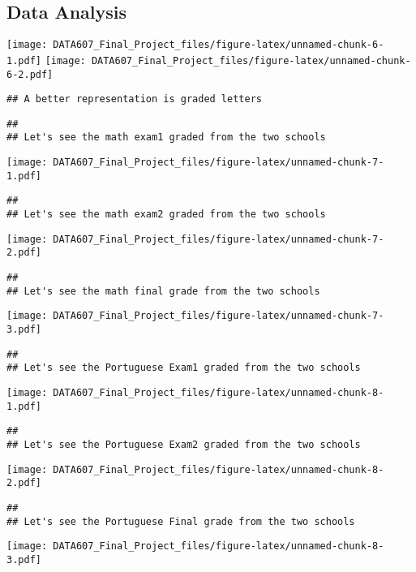 \documentclass[
]{article}
\begin{document}
\hypertarget{data-analysis}{%
\subsection{Data Analysis}\label{data-analysis}}

\texttt{[image: DATA607\_Final\_Project\_files/figure-latex/unnamed-chunk-6-1.pdf]}
\texttt{[image: DATA607\_Final\_Project\_files/figure-latex/unnamed-chunk-6-2.pdf]}

\begin{verbatim}
## A better representation is graded letters
\end{verbatim}

\begin{verbatim}
## 
## Let's see the math exam1 graded from the two schools
\end{verbatim}

\texttt{[image: DATA607\_Final\_Project\_files/figure-latex/unnamed-chunk-7-1.pdf]}

\begin{verbatim}
## 
## Let's see the math exam2 graded from the two schools
\end{verbatim}

\texttt{[image: DATA607\_Final\_Project\_files/figure-latex/unnamed-chunk-7-2.pdf]}

\begin{verbatim}
## 
## Let's see the math final grade from the two schools
\end{verbatim}

\texttt{[image: DATA607\_Final\_Project\_files/figure-latex/unnamed-chunk-7-3.pdf]}

\begin{verbatim}
## 
## Let's see the Portuguese Exam1 graded from the two schools
\end{verbatim}

\texttt{[image: DATA607\_Final\_Project\_files/figure-latex/unnamed-chunk-8-1.pdf]}

\begin{verbatim}
## 
## Let's see the Portuguese Exam2 graded from the two schools
\end{verbatim}

\texttt{[image: DATA607\_Final\_Project\_files/figure-latex/unnamed-chunk-8-2.pdf]}

\begin{verbatim}
## 
## Let's see the Portuguese Final grade from the two schools
\end{verbatim}

\texttt{[image: DATA607\_Final\_Project\_files/figure-latex/unnamed-chunk-8-3.pdf]}
\end{document}
